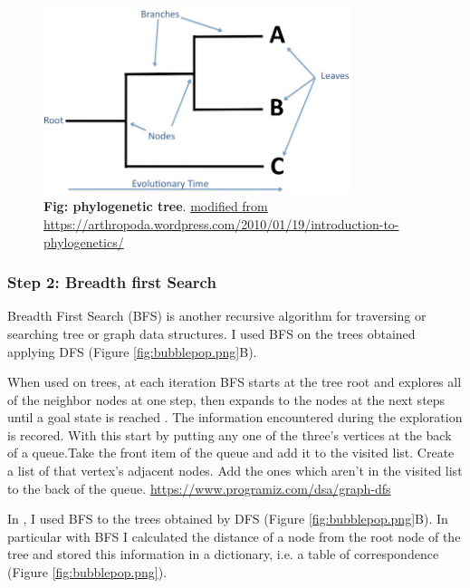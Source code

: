 \begin{figure}[H]
\centering
\includegraphics[width=0.80\textwidth]{fig/phylogenies.jpg}
\decoRule
\caption{\textbf{Fig: phylogenetic tree}. 
\url{modified from https://arthropoda.wordpress.com/2010/01/19/introduction-to-phylogenetics/}}
\label{fig:phylogenies.jpg}
\end{figure}

\subsubsection{Step 2: Breadth first Search}
Breadth First Search (BFS) \cite{beamer2012direction} is another recursive algorithm for traversing or searching tree or graph data structures. I used BFS on the trees obtained applying DFS (Figure \ref{fig:bubblepop.png}B).

When used on trees, at each iteration BFS starts at the tree root and explores all of the neighbor nodes at one step, then expands to the nodes at the next steps until a goal state is reached \cite{korf1985depth, wiki:BFS}. The information encountered during the exploration is recored. 
With this start by putting any one of the three's vertices at the back of a queue.Take the front item of the queue and add it to the visited list. Create a list of that vertex's adjacent nodes. Add the ones which aren't in the visited list to the back of the queue. \url{https://www.programiz.com/dsa/graph-dfs}

In \bbp, I used BFS to the trees obtained by DFS (Figure \ref{fig:bubblepop.png}B).
In particular with BFS I calculated the distance of a node from the root node of the tree and stored this information in a dictionary, i.e. a table of correspondence (Figure \ref{fig:bubblepop.png}). 


